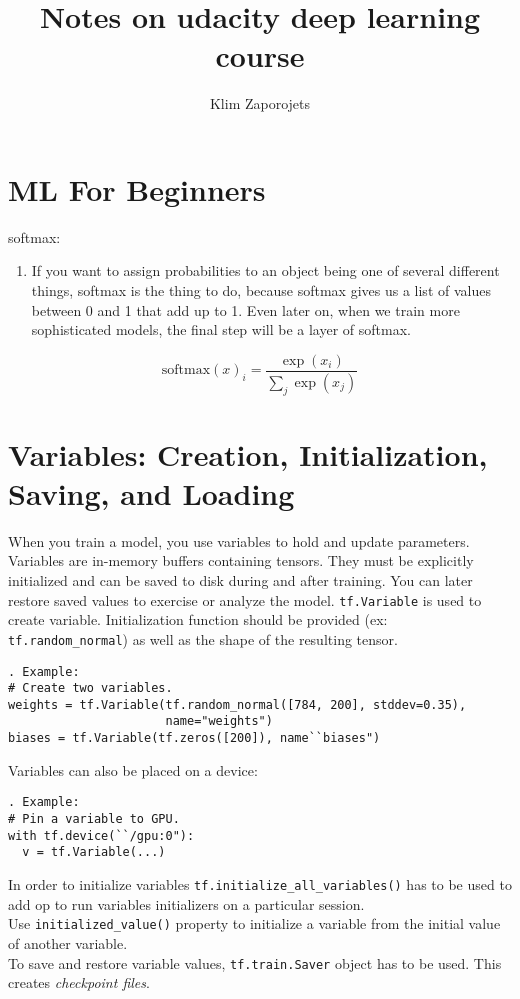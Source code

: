 \documentclass[11pt,a4paper]{article}
\author{Klim Zaporojets}
\title{Notes on udacity deep learning course}
\begin{document}
\section{ML For Beginners}
softmax:
\begin{enumerate}
	\item If you want to assign probabilities to an object being one of several different things, softmax is the thing to do, because softmax gives us a list of values between 0 and 1 that add up to 1. Even later on, when we train more sophisticated models, the final step will be a layer of softmax.
\end{enumerate}

$$\text{softmax}(x)_i = \dfrac{\exp(x_i)}{\sum_j{\exp(x_j)}}$$

\section{Variables: Creation, Initialization, Saving, and Loading}
When you train a model, you use variables to hold and update parameters. Variables are in-memory buffers containing tensors. They must be explicitly initialized and can be saved to disk during and after training. You can later restore saved values to exercise or analyze the model.
\texttt{tf.Variable} is used to create variable. Initialization function should be provided (ex: \texttt{tf.random\_normal}) as well as the shape of the resulting tensor. 
\begin{lstlisting}. Example: 
# Create two variables.
weights = tf.Variable(tf.random_normal([784, 200], stddev=0.35),
                      name="weights")
biases = tf.Variable(tf.zeros([200]), name``biases")
\end{lstlisting}
Variables can also be placed on a device: 
\begin{lstlisting}. Example: 
# Pin a variable to GPU.
with tf.device(``/gpu:0"):
  v = tf.Variable(...)
\end{lstlisting} 
In order to initialize variables \texttt{tf.initialize\_all\_variables()} has to be used to add op to run variables initializers on a particular session. \\
Use \texttt{initialized\_value()} property to initialize a variable from the initial value of another variable. \\
To save and restore variable values, \texttt{tf.train.Saver} object has to be used. This creates \textit{checkpoint files}. 
\end{document}
